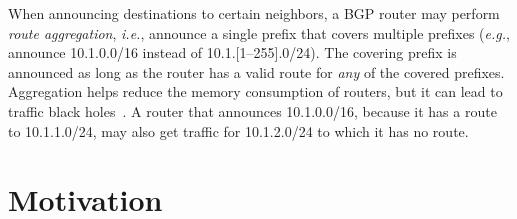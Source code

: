 \documentclass[numbers, 10pt, preprint]{sigplanconf}
\newcommand{\EG}{\emph{e.g.}}
\newcommand{\IE}{\emph{i.e.}}
\begin{document}
When announcing destinations to certain neighbors, a BGP router may perform {\em route aggregation}, \IE, announce a single prefix that covers multiple prefixes (\EG, announce 10.1.0.0/16 instead of 10.1.[1--255].0/24). The covering prefix is announced as long as the router has a valid route for {\em any} of the covered prefixes. Aggregation helps reduce the memory consumption of routers, but it can lead to traffic black holes~\cite{route-aggregation}. A router that announces 10.1.0.0/16, because it has a route to 10.1.1.0/24, may also get traffic for 10.1.2.0/24 to which it has no route.






\section{Motivation}
\label{sec:motivation}
\end{document}
